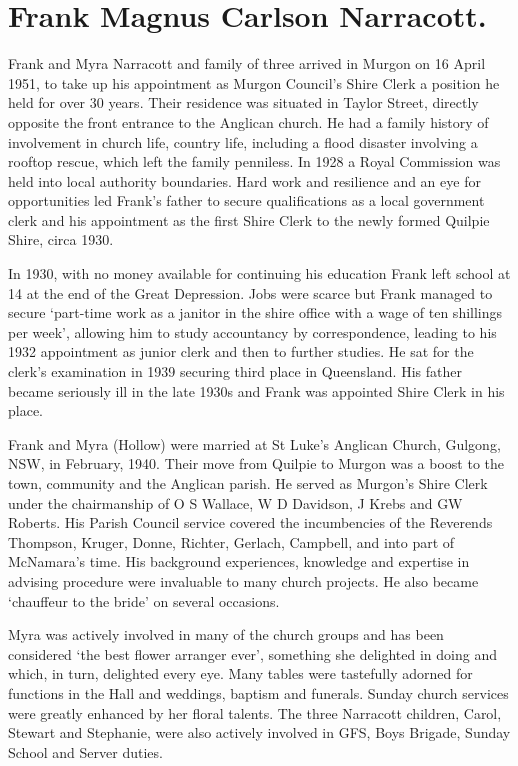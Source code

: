 \hypertarget{frank-magnus-carlson-narracott.}{%
\section{Frank Magnus Carlson Narracott.}\label{frank-magnus-carlson-narracott.}}

Frank and Myra Narracott and family of three arrived in Murgon on 16 April 1951, to take up his appointment as Murgon Council's Shire Clerk a position he held for over 30 years. Their residence was situated in Taylor Street, directly opposite the front entrance to the Anglican church. He had a family history of involvement in church life, country life, including a flood disaster involving a rooftop rescue, which left the family penniless. In 1928 a Royal Commission was held into local authority boundaries. Hard work and resilience and an eye for opportunities led Frank's father to secure qualifications as a local government clerk and his appointment as the first Shire Clerk to the newly formed Quilpie Shire, circa 1930.

In 1930, with no money available for continuing his education Frank left school at 14 at the end of the Great Depression. Jobs were scarce but Frank managed to secure `part-time work as a janitor in the shire office with a wage of ten shillings per week', allowing him to study accountancy by correspondence, leading to his 1932 appointment as junior clerk and then to further studies. He sat for the clerk's examination in 1939 securing third place in Queensland. His father became seriously ill in the late 1930s and Frank was appointed Shire Clerk in his place.

Frank and Myra (Hollow) were married at St Luke's Anglican Church, Gulgong, NSW, in February, 1940. Their move from Quilpie to Murgon was a boost to the town, community and the Anglican parish. He served as Murgon's Shire Clerk under the chairmanship of O S Wallace, W D Davidson, J Krebs and GW Roberts. His Parish Council service covered the incumbencies of the Reverends Thompson, Kruger, Donne, Richter, Gerlach, Campbell, and into part of McNamara's time. His background experiences, knowledge and expertise in advising procedure were invaluable to many church projects. He also became `chauffeur to the bride' on several occasions.

Myra was actively involved in many of the church groups and has been considered `the best flower arranger ever', something she delighted in doing and which, in turn, delighted every eye. Many tables were tastefully adorned for functions in the Hall and weddings, baptism and funerals. Sunday church services were greatly enhanced by her floral talents. The three Narracott children, Carol, Stewart and Stephanie, were also actively involved in GFS, Boys Brigade, Sunday School and Server duties.

